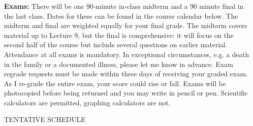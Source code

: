 \documentclass[11pt, letterpaper]{article}
\begin{document}
\noindent \textbf{Exams:} There will be one 90-minute in-class midterm and a 90 minute final in the last class. Dates
for these can be found in the course calendar below. The midterm and final are weighted equally
for your final grade. The midterm covers material up to Lecture 9, but the final is comprehensive:
it will focus on the second half of the course but include several questions on earlier material.
Attendance at
all exams is mandatory. In exceptional circumstances, e.g. a death in the family or a documented illness, please let me know in advance. Exam regrade
requests must be made within three days of receiving your graded exam. As I re-grade the entire
exam, your score could rise or fall. Exams will be photocopied before being returned and you may
write in pencil or pen. Scientific calculators are permitted, graphing calculators are not.

\medskip
\bigskip
\begin{center}
\small
TENTATIVE SCHEDULE
\end{center}
\end{document}
